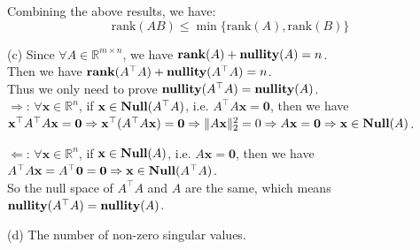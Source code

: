Combining the above results, we have:
$$\text{rank}(AB) \leq \min\{\text{rank}(A), \text{rank}(B)\}$$








(c) Since $\forall A\in\mathbb{R}^{m\times n}$, we have $\mathop{\bf rank}(A)+\textbf{nullity}(A)=n$. \\
Then we have $\mathop{\bf rank}(A^{\top}A)+\textbf{nullity}(A^{\top}A)=n$. \\
Thus we only need to prove $\textbf{nullity}(A^{\top}A)=\textbf{nullity}(A)$. \\

$\Rightarrow$: $\forall \mathbf{x}\in\mathbb{R}^{n}$, if $\mathbf{x}\in\textbf{Null}(A^{\top}A)$, i.e. $A^{\top}A\mathbf{x}=\mathbf{0}$, then we have $\mathbf{x}^{\top}A^{\top}A\mathbf{x}=\mathbf{0}\Rightarrow \mathbf{x}^{\top}(A^{\top}A\mathbf{x})=\mathbf{0}\Rightarrow \|A\mathbf{x}\|_2^{2}=0\Rightarrow A\mathbf{x}=\mathbf{0}\Rightarrow \mathbf{x}\in\textbf{Null}(A)$.

$\Leftarrow$: $\forall \mathbf{x}\in\mathbb{R}^{n}$, if $\mathbf{x}\in\textbf{Null}(A)$, i.e. $A\mathbf{x}=\mathbf{0}$, then we have $A^{\top}A\mathbf{x}=A^{\top}\mathbf{0}=\mathbf{0}\Rightarrow \mathbf{x}\in\textbf{Null}(A^{\top}A)$. \\

So the null space of $A^{\top}A$ and $A$ are the same, which means $\textbf{nullity}(A^{\top}A)=\textbf{nullity}(A)$.

(d) The number of non-zero singular values.

\newpage
